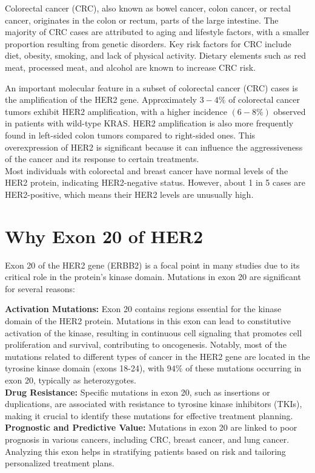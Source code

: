 \documentclass[12pt]{article}
\begin{document}
Colorectal cancer (CRC), also known as bowel cancer, colon cancer, or rectal cancer, originates in the colon or rectum, parts of the large intestine. The majority of CRC cases are attributed to aging and lifestyle factors, with a smaller proportion resulting from genetic disorders. Key risk factors for CRC include diet, obesity, smoking, and lack of physical activity. Dietary elements such as red meat, processed meat, and alcohol are known to increase CRC risk.

An important molecular feature in a subset of colorectal cancer (CRC) cases is the amplification of the HER2 gene. Approximately $3-4\%$ of colorectal cancer tumors exhibit HER2 amplification, with a higher incidence $(6-8\%)$ observed in patients with wild-type KRAS. HER2 amplification is also more frequently found in left-sided colon tumors compared to right-sided ones. This overexpression of HER2 is significant because it can influence the aggressiveness of the cancer and its response to certain treatments.\\[5px]

Most individuals with colorectal and breast cancer have normal levels of the HER2 protein, indicating HER2-negative status. However, about 1 in 5 cases are HER2-positive, which means their HER2 levels are unusually high.



\section{Why Exon 20 of HER2}

Exon 20 of the HER2 gene (ERBB2) is a focal point in many studies due to its critical role in the protein's kinase domain. Mutations in exon 20 are significant for several reasons:

\textbf{Activation Mutations:} Exon 20 contains regions essential for the kinase domain of the HER2 protein. Mutations in this exon can lead to constitutive activation of the kinase, resulting in continuous cell signaling that promotes cell proliferation and survival, contributing to oncogenesis. Notably, most of the mutations related to different types of cancer in the HER2 gene are located in the tyrosine kinase domain (exons 18-24), with $94\%$ of these mutations occurring in exon 20, typically as heterozygotes.\\[5px]
\textbf{Drug Resistance:} Specific mutations in exon 20, such as insertions or duplications, are associated with resistance to tyrosine kinase inhibitors (TKIs), making it crucial to identify these mutations for effective treatment planning.\\[5px]
\textbf{Prognostic and Predictive Value:} Mutations in exon 20 are linked to poor prognosis in various cancers, including CRC, breast cancer, and lung cancer. Analyzing this exon helps in stratifying patients based on risk and tailoring personalized treatment plans.
\end{document}
